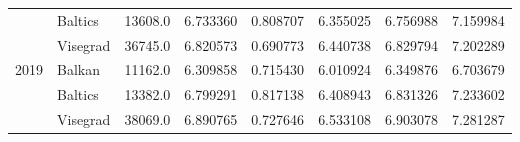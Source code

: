 \documentclass[11pt]{article}
\begin{document}
\begin{table}[!htbp]
{\begin{tabular}{llrrrrrr}
     & Baltics &  13608.0 &  6.733360 &  0.808707 &  6.355025 &  6.756988 &  7.159984 \\
     & Visegrad &  36745.0 &  6.820573 &  0.690773 &  6.440738 &  6.829794 &  7.202289 \\
2019 & Balkan &  11162.0 &  6.309858 &  0.715430 &  6.010924 &  6.349876 &  6.703679 \\
     & Baltics &  13382.0 &  6.799291 &  0.817138 &  6.408943 &  6.831326 &  7.233602 \\
     & Visegrad &  38069.0 &  6.890765 &  0.727646 &  6.533108 &  6.903078 &  7.281287 \\
\bottomrule
\end{tabular}
}
\end{table}
\end{document}
